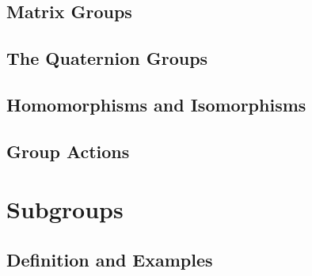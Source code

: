 \documentclass[cn,11pt,chinese]{elegantbook}
\numberwithin{equation}{section}
\begin{document}
\section{Matrix Groups}\label{section00104}



\section{The Quaternion Groups}\label{section00105}



\section{Homomorphisms and Isomorphisms}\label{section00106}



\section{Group Actions}\label{section00107}




\chapter{Subgroups}\label{chapter002}
\section{Definition and Examples}\label{section00201}







% 

\appendix
\end{document}
